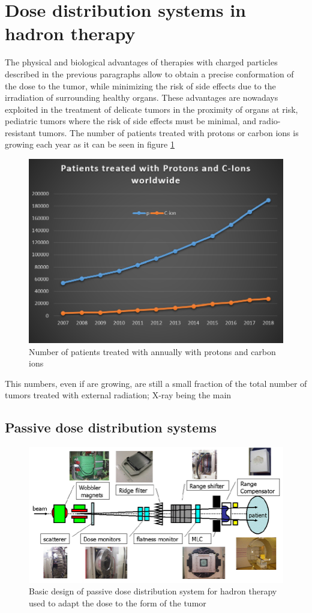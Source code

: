 \section{Dose distribution systems in hadron therapy}
The physical and biological advantages of therapies with charged particles described in the previous paragraphs allow to obtain a precise conformation of the dose to the tumor, while minimizing the risk of side effects due to the irradiation of surrounding healthy organs.
These advantages are nowadays exploited in the treatment of delicate tumors in the proximity of organs at risk, pediatric tumors where the risk of side effects must be minimal, and radio-resistant tumors.
The number of patients treated with protons or carbon ions is growing each year as it can be seen in figure \ref{fig:patientstreated}
\begin{figure}[H]
	\centering
	\includegraphics[width=0.7\linewidth]{IMG/ch1/PatientsTreated}
	\caption{Number of patients treated with annually with protons and carbon ions}
	\label{fig:patientstreated}
\end{figure}
This numbers, even if are growing, are still a small fraction of the total number of tumors treated with external radiation; X-ray being the main

\subsection{Passive dose distribution systems}

\begin{figure}[H]
	\centering
	\includegraphics[width=0.7\linewidth]{IMG/ch1/Basic-design-of-irradiation-system-for-hadron-therapy}
	\caption{Basic design of passive dose distribution system for hadron therapy used to adapt the dose to the form of the tumor}
	\label{fig:passive}
\end{figure}
